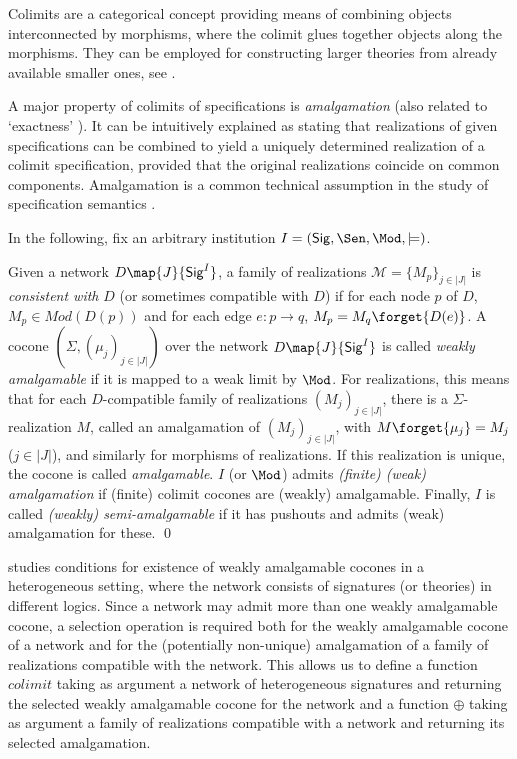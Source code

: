 \documentclass[10pt, a4paper]{isov2}
\newcommand{\Sig}{\mathsf{Sig}}
\begin{document}
Colimits are a categorical concept providing means of
combining objects interconnected by morphisms, where the colimit
glues together objects along the morphisms.
They can be employed for constructing larger theories from already available
smaller ones, see \cite{GoguenBurstall92}. 


A major property of colimits of specifications is \emph{amalgamation} (also related to `exactness' \cite{DGS91}). It can be intuitively explained as
stating that realizations of given
specifications can be combined to yield a uniquely determined realization of
a colimit specification, provided that the original realizations coincide on
common components. Amalgamation is a common technical assumption in the
study of specification semantics
\cite{STbook}.

In the following, fix an arbitrary institution
$I=(\Sig,\Sen,\Mod,\models)$.

\begin{definition}
Given a network $D\map{J}{\Sig^I}$,
a family of realizations $\mathcal{M} = \{M_p\}_{j\in |J|}$ is
\emph{consistent with} $D$ (or sometimes compatible with $D$)
if for each node $p$ of $D$, $M_p \in Mod(D(p))$ and
for each edge $e:p\rightarrow q$, $M_p = M_q\forget{D(e)}$.
  A cocone
$(\Sigma,(\mu_j)_{j\in|J|})$ over the network $D\map{J}{\Sig^I}$ is
called \emph{weakly amalgamable} if it is mapped to a weak limit by $\Mod$.
For realizations, this means that for each $D$-compatible family of
realizations $(M_j)_{j\in|J|}$, there is a $\Sigma$-realization $M$, called an amalgamation of
 $(M_j)_{j\in|J|}$,
with
$M\forget{\mu_j}=M_j$ ($j\in|J|$), and similarly for morphisms of
realizations.
 If this realization is unique, the cocone
is called \emph{amalgamable}.
$I$ (or $\Mod$) admits \emph{(finite) (weak)
amalgamation} if (finite) colimit cocones are (weakly) amalgamable.
Finally, $I$ is called \emph{(weakly) semi-amalgamable} if
it has pushouts and admits (weak) amalgamation for these.
\qed\end{definition}

\cite{weakcol} studies conditions for existence of weakly amalgamable cocones
in a heterogeneous setting, where the network consists of signatures (or theories)
in different logics. Since a network may admit more than one weakly amalgamable cocone,
a selection operation is required both for the weakly amalgamable cocone of a network
and for the (potentially non-unique) amalgamation of a family of realizations compatible with the
network. This allows us to define a function
$colimit$ taking as argument a network of heterogeneous signatures and
returning the selected weakly amalgamable cocone for the network and
a function $\oplus$ taking as argument a family of realizations compatible with a network
and returning its selected amalgamation.
\end{document}

